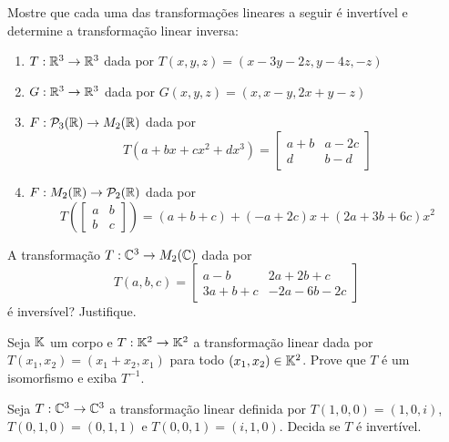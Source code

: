 \documentclass[12pt]{exam}
\begin{document}
\begin{exercicio}
    Mostre que cada uma das transformaç\~oes lineares a seguir é invertível e determine a transformação linear inversa:
    \begin{enumerate}[label={\alph*})]
        \item $T : \mathbb{R}^3 \to \mathbb{R}^3$ dada por $T(x,y,z) = (x - 3y - 2z, y - 4z, -z)$

        \item $G : \mathbb{R}^3 \to \mathbb{R}^3$ dada por $G(x,y,z) = (x, x - y, 2x + y -z)$

        \item $F : \mathcal{P}_3(\mathbb{R}) \to M_2(\mathbb{R})$ dada por
        \[
        T(a + bx + cx^2 + dx^3) = \begin{bmatrix}
            a + b & a - 2c\\
            d & b - d
        \end{bmatrix}
        \]

        \item $F : M_2(\mathbb{R}) \to \mathcal{P}_2(\mathbb{R})$ dada por
        \[
        T\left(\begin{bmatrix}
            a & b\\b & c
        \end{bmatrix}\right) = (a + b + c) + (-a + 2c)x + (2a + 3b + 6c)x^2
        \]
    \end{enumerate}
\end{exercicio}

\begin{exercicio}
    A transformação $T : \mathbb{C}^3 \to M_2(\mathbb{C})$ dada por
    \[
    T(a,b,c) = \begin{bmatrix}
        a - b & 2a + 2b + c\\
        3a + b + c & -2a - 6b -2c
    \end{bmatrix}
    \]
    é inversível? Justifique.
\end{exercicio}


\begin{exercicio}
    Seja $\mathbb{K}$ um corpo e $T : \mathbb{K}^2 \to \mathbb{K}^2$ a transformação linear dada por $T(x_1,x_2) = (x_1 + x_2, x_1)$ para todo $(x_1,x_2) \in \mathbb{K}^2$. Prove que $T$ é um isomorfismo e exiba $T^{-1}$.
\end{exercicio}

\begin{exercicio}
    Seja $T : \mathbb{C}^3 \to \mathbb{C}^3$ a transformação linear definida por $T(1,0,0) = (1,0,i)$, $T(0,1,0) = (0,1,1)$ e $T(0,0,1) = (i,1,0)$. Decida se $T$ é invertível.
\end{exercicio}
\end{document}
